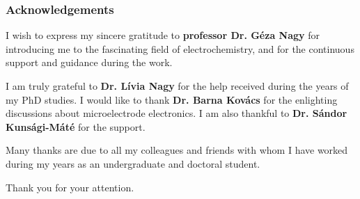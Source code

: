 \documentclass{beamer}
\begin{document}
\begin{frame}
\frametitle{Acknowledgements}
\scriptsize
I wish to express my sincere gratitude to \textbf{professor Dr. Géza Nagy} for introducing me to the fascinating field of electrochemistry, and for the continuous support and guidance during the work.

\vspace{4mm}

I am truly grateful to \textbf{Dr. Lívia Nagy} for the help received during the years of my PhD studies. I would like to thank \textbf{Dr. Barna Kovács} for the enlighting discussions about microelectrode electronics. I am also thankful to \textbf{Dr. Sándor Kunsági-Máté} for the support.

\vspace{4mm}

Many thanks are due to all my colleagues and friends with whom I have worked during my years as an undergraduate and doctoral student.

\end{frame}

\begin{frame}
\centering
Thank you for your attention.
\end{frame}
\end{document}
